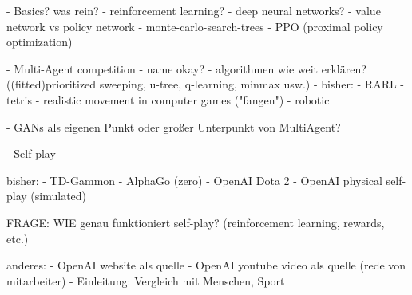 - Basics?
was rein?
	- reinforcement learning?
    - deep neural networks?
    - value network vs policy network
    - monte-carlo-search-trees
    - PPO (proximal policy optimization)
    

- Multi-Agent competition
	- name okay?
    - algorithmen wie weit erklären? ((fitted)prioritized sweeping, u-tree, q-learning, minmax usw.)
    - bisher:
    	- RARL
        - tetris
        - realistic movement in computer games ("fangen")
        - robotic

- GANs als eigenen Punkt oder großer Unterpunkt von MultiAgent?

- Self-play

bisher:
	- TD-Gammon
    - AlphaGo (zero)
    - OpenAI Dota 2
    - OpenAI physical self-play (simulated)
    
    FRAGE: WIE genau funktioniert self-play? (reinforcement learning, rewards, etc.)
    
anderes:
	- OpenAI website als quelle
    - OpenAI youtube video als quelle (rede von mitarbeiter)
    - Einleitung: Vergleich mit Menschen, Sport